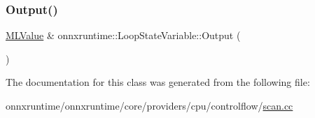 \mbox{\label{classonnxruntime_1_1LoopStateVariable_a1d2635e8030adfcb688a39d8996584b2}} 
\subsubsection{\texorpdfstring{Output()}{Output()}}
{\footnotesize\ttfamily \mbox{\hyperlink{classonnxruntime_1_1MLValue}{M\+L\+Value}} \& onnxruntime\+::\+Loop\+State\+Variable\+::\+Output (\begin{DoxyParamCaption}{ }\end{DoxyParamCaption})}



The documentation for this class was generated from the following file\+:\begin{DoxyCompactItemize}
\item 
onnxruntime/onnxruntime/core/providers/cpu/controlflow/\mbox{\hyperlink{scan_8cc}{scan.\+cc}}\end{DoxyCompactItemize}
